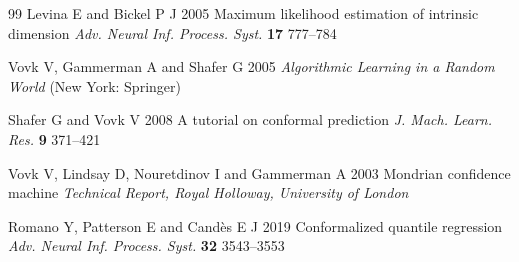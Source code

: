 \documentclass[12pt]{iopart}
\theoremstyle{definition}
\theoremstyle{plain}
\theoremstyle{remark}
\begin{document}
\begin{thebibliography}{99}
Levina E and Bickel P J 2005
Maximum likelihood estimation of intrinsic dimension
\emph{Adv. Neural Inf. Process. Syst.} \textbf{17} 777--784

Vovk V, Gammerman A and Shafer G 2005
\emph{Algorithmic Learning in a Random World}
(New York: Springer)

Shafer G and Vovk V 2008
A tutorial on conformal prediction
\emph{J. Mach. Learn. Res.} \textbf{9} 371--421

Vovk V, Lindsay D, Nouretdinov I and Gammerman A 2003
Mondrian confidence machine
\emph{Technical Report, Royal Holloway, University of London}

Romano Y, Patterson E and Cand\`es E J 2019
Conformalized quantile regression
\emph{Adv. Neural Inf. Process. Syst.} \textbf{32} 3543--3553

\end{thebibliography}
\end{document}
